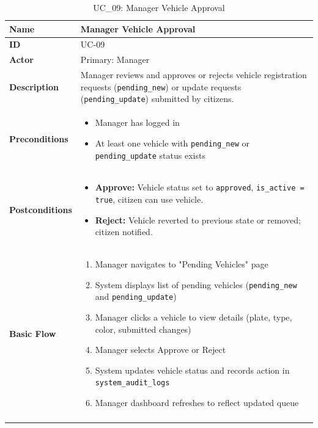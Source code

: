 \documentclass[a4paper]{article}
\newlength{\ucLeft}
\begin{document}
\begin{longtable}{|>{\bfseries}p{\ucLeft}|
                p{\dimexpr\textwidth-\ucLeft-4\tabcolsep-3\arrayrulewidth\relax}|}
\hline
Name & Manager Vehicle Approval \\ \hline
ID & UC-09 \\ \hline
Actor & Primary: Manager \\ \hline
Description & Manager reviews and approves or rejects vehicle registration requests (\texttt{pending\_new}) or update requests (\texttt{pending\_update}) submitted by citizens.\\ \hline
Preconditions &
\begin{itemize}[leftmargin=*, nosep, topsep=0pt, partopsep=0pt, parsep=0pt]
    \item Manager has logged in
    \item At least one vehicle with \texttt{pending\_new} or \texttt{pending\_update} status exists
\end{itemize}
\\ \hline
Postconditions &
\begin{itemize}[leftmargin=*, nosep, topsep=0pt, partopsep=0pt, parsep=0pt, after=\strut]
    \item \textbf{Approve:} Vehicle status set to \texttt{approved}, \texttt{is\_active = true}, citizen can use vehicle.
    \item \textbf{Reject:} Vehicle reverted to previous state or removed; citizen notified.
\end{itemize}
\\ \hline
Basic Flow & 
\begin{enumerate}[leftmargin=*, nosep, topsep=0pt, partopsep=0pt, parsep=0pt]
    \item Manager navigates to "Pending Vehicles" page
    \item System displays list of pending vehicles (\texttt{pending\_new} and \texttt{pending\_update})
    \item Manager clicks a vehicle to view details (plate, type, color, submitted changes)
    \item Manager selects Approve or Reject
    \item System updates vehicle status and records action in \texttt{system\_audit\_logs}
    \item Manager dashboard refreshes to reflect updated queue
\end{enumerate}
\\ \hline
\caption{UC\_09: Manager Vehicle Approval}\label{tab:uc09}
\end{longtable}
\end{document}

